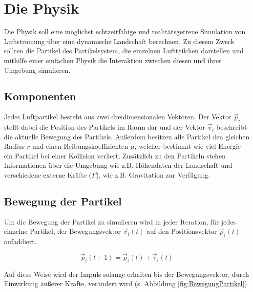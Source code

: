 \section{Die Physik}
\begin{Spacing}{\mylinespace}
    Die Physik soll eine möglichst echtzeitfähige und
    realitätsgetreue Simulation von Luftströmung über eine dynamische Landschaft berechnen.
    Zu diesem Zweck sollten die Partikel des Partikelsystem, die einzelnen
    Luftteilchen darstellen und mithilfe einer einfachen Physik
    die Interaktion zwischen diesen und ihrer Umgebung simulieren.
    \subsection{Komponenten}
        Jedes Luftpartikel besteht aus zwei dreidimensionalen Vektoren.
        Der Vektor $\vec{p}_{i}$ stellt dabei die Position des Partikels im
        Raum dar und der Vektor $\vec{v}_{i}$ beschreibt die aktuelle Bewegung des Partikels.
        Außerdem besitzen alle Partikel den gleichen Radius $r$ und einen
        Reibungskoeffizienten $\mu$, welcher bestimmt wie viel Energie ein Partikel
        bei einer Kollision verliert.
        Zusätzlich zu den Partikeln stehen Informationen über die Umgebung
        wie z.B. Höhendaten der Landschaft und verschiedene externe
        Kräfte ($F$), wie z.B. Gravitation zur Verfügung.



    \subsection{Bewegung der Partikel}
        Um die Bewegung der Partikel zu simulieren wird in jeder Iteration,
        für jedes einzelne Partikel, der Bewegungsvektor $\vec{v}_{i}(t)$
        auf den Positionsvektor $ \vec{p}_{i}(t) $ aufaddiert.

        \[ \vec{p}_{i}(t+1) = \vec{p}_{i}(t) + \vec{v}_{i}(t) \]

        Auf diese Weise wird der Impuls solange erhalten bis der Bewegungsvektor,
        durch Einwirkung äußerer Kräfte, verändert wird (s. Abbildung \ref{fig:BewegungPartikel}).


\end{Spacing}

